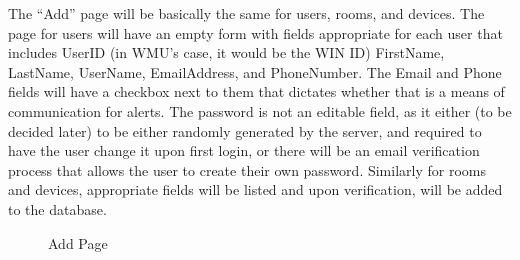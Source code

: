 \documentclass{report}
\begin{document}
The “Add” page will be basically the same for users, rooms, and devices.  The page for users will have an empty form with fields appropriate for each user that includes UserID (in WMU’s case, it would be the WIN ID) FirstName, LastName, UserName, EmailAddress, and PhoneNumber.  The Email and Phone fields will have a checkbox next to them that dictates whether that is a means of communication for alerts.  The password is not an editable field, as it either (to be decided later) to be either randomly generated by the server, and required to have the user change it upon first login, or there will be an email verification process that allows the user to create their own password.  Similarly for rooms and devices, appropriate fields will be listed and upon verification, will be added to the database. 
\begin{figure}[H]
\caption{Add Page}
\end{figure}
\newpage
%
%
%
%
%	
%
\newpage
\end{document}
